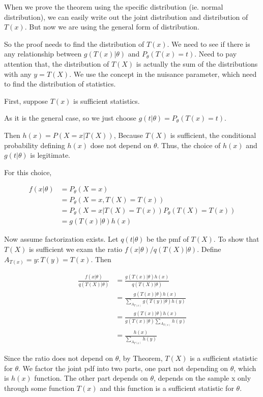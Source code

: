 When we prove the theorem using the specific distribution (ie. normal distribution), we can easily write out the joint distribution and distribution of $T(x)$. But now we are using the general form of distribution.

So the proof needs to find the distribution of $T(x)$. We need to see if there is any relationship between $g(T(x)| \theta)$ and $P_{\theta}(T(x) = t)$. Need to pay attention that, the distribution of $T(X)$ is actually the sum of the distributions with any $y = T(X)$. We use the concept in the nuisance parameter, which need to find the distribution of statistics.


First, suppose $T(x)$ is sufficient statistics. 

As it is the general case, so we just choose 
$g(t| \theta) = P_{\theta}(T(x) = t)$.

Then $h(x) = P(X=x | T(X))$, Because $T(X)$ is sufficient, the conditional probability defining  
$h(x)$ dose not depend on $\theta$. Thus, the choice of $h(x)$ and $g(t|\theta)$ is legitimate.

For this choice,

\begin{align*}
	f(x | \theta) &= P_{\theta}(X = x) \\
	&=  P_{\theta}(X = x, T(X)= T(x)) \\
	&= P_{\theta}(X = x | T(X)= T(x)) P_{\theta}(T(X) = T(x)) \\
	&= g(T(x)| \theta) h(x)
\end{align*}

Now assume factorization exists. Let $q(t|\theta)$ be the pmf of $T(X)$. To show that $T(X)$ is sufficient we exam the ratio $f(x|\theta) / q(T(X)|\theta)$. Define $A_{T(x)} = y: T(y) = T(x)$. Then

\begin{align*}
	\frac{f(x | \theta)}{q(T(X)|\theta)} &= \frac{g(T(x)| \theta) h(x)}{q(T(X)|\theta)} \\
	&=  \frac{g(T(x)| \theta) h(x)}{\sum_{A_{T(x)} } g(T(y)| \theta) h(y)} \\
	&=  \frac{g(T(x)| \theta) h(x)}{g(T(x)| \theta) \sum_{A_{T(x)} }  h(y)} \\
	&= \frac{h(x)}{\sum_{A_{T(x)} }  h(y)}
\end{align*}

Since the ratio does not depend on $\theta$, by Theorem, $T(X)$ is a sufficient statistic for  
$\theta$. We factor the joint pdf into two parts, one part not depending on $\theta$, which is  
$h(x)$ function. The other part depends on $\theta$, depends on the sample x only through some function $T(x)$ and this function is a sufficient statistic for $\theta$.


